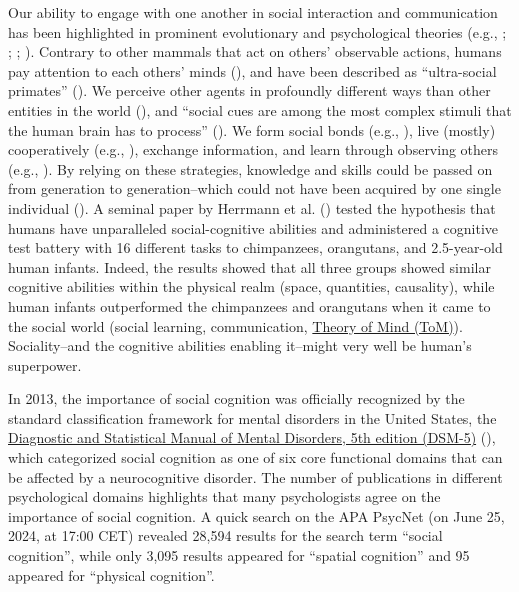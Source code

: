 \documentclass[
]{scrbook}
\begin{document}
Our ability to engage with one another in social interaction and communication has been highlighted in prominent evolutionary and psychological theories (e.g., ; ; ; ). Contrary to other mammals that act on others' observable actions, humans pay attention to each others' minds (), and have been described as ``ultra-social primates'' (). We perceive other agents in profoundly different ways than other entities in the world (), and ``social cues are among the most complex stimuli that the human brain has to process'' (). We form social bonds (e.g., ), live (mostly) cooperatively (e.g., ), exchange information, and learn through observing others (e.g., ). By relying on these strategies, knowledge and skills could be passed on from generation to generation\thinspace --\thinspace which could not have been acquired by one single individual (). A seminal paper by Herrmann et al. () tested the hypothesis that humans have unparalleled social-cognitive abilities and administered a cognitive test battery with 16 different tasks to chimpanzees, orangutans, and 2.5-year-old human infants. Indeed, the results showed that all three groups showed similar cognitive abilities within the physical realm (space, quantities, causality), while human infants outperformed the chimpanzees and orangutans when it came to the social world (social learning, communication, \hyperref[acronyms_ToM]{Theory of Mind (ToM)}). Sociality\thinspace --\thinspace and the cognitive abilities enabling it\thinspace --\thinspace might very well be human's superpower.

In 2013, the importance of social cognition was officially recognized by the standard classification framework for mental disorders in the United States, the \hyperref[acronyms_DSM-5]{Diagnostic and Statistical Manual of Mental Disorders, 5th edition (DSM-5)} (), which categorized social cognition as one of six core functional domains that can be affected by a neurocognitive disorder. The number of publications in different psychological domains highlights that many psychologists agree on the importance of social cognition. A quick search on the APA PsycNet (on June 25, 2024, at 17:00 CET) revealed 28,594 results for the search term ``social cognition'', while only 3,095 results appeared for ``spatial cognition'' and 95 appeared for ``physical cognition''.
\end{document}
